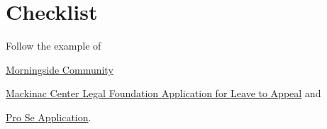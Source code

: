\documentclass[12pt,\documentclassflag]{michiganCourtOfAppealsBrief}
\begin{document}
\section{Checklist}
\begin{todolist}
\item Follow the example of
  \begin{todolist}
  \item \href{https://www.naacpldf.org/files/about-us/2017-11-1%20MorningSide%20v.%20Sabree%20Leave%20Application%20-%20Final.pdf}{Morningside Community}
      \item \href{https://www.mackinac.org/archives/2010/ApplicationforLeavetoAppealtoMSC.pdf}{Mackinac Center Legal Foundation Application for Leave to Appeal} and
      \item  \href{https://courts.michigan.gov/Courts/MichiganSupremeCourt/Clerks/ClerksOfficeDocuments/Pro-Per_MI-Sup-Ct_Civil-Application_05-2017_FillableForm.pdf}{Pro Se Application}.
      \end{todolist}









\end{todolist}
\end{document}
